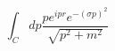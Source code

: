 \documentclass{minimal}
\begin{document}
$$\int_C dp \frac{p e^{ipr} e^{-(\sigma p)^2}}{\sqrt{p^2 + m^2}}$$
\end{document}
